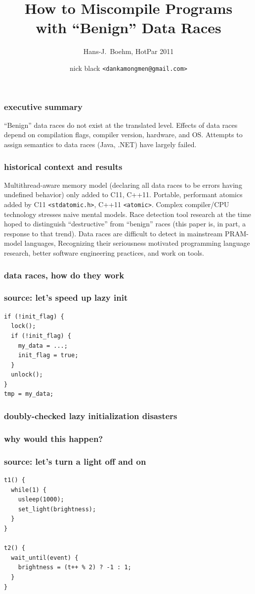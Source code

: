 \documentclass{beamer}
\title{How to Miscompile Programs\\ with ``Benign'' Data Races}
\subtitle{Hans-J.\ Boehm, HotPar 2011}
\author{nick black {\texttt{<dankamongmen@gmail.com>}}}
\institute{Atlanta PWL \#09, 2018-10-09}
\date{}
\begin{document}
\begin{frame}
\titlepage
\end{frame}

\begin{frame}
\frametitle{executive summary}
``Benign'' data races do not exist at the translated level.
\vfill
Effects of data races depend on compilation flags, compiler version, hardware,
and OS.
\vfill
Attempts to assign semantics to data races (Java, .NET) have largely failed.
\end{frame}

\begin{frame}
\frametitle{historical context and results}
Multithread-aware memory model (declaring all data races to be errors having undefined behavior) only added to C11, C++11.
\vfill
Portable, performant atomics added by C11 \texttt{<stdatomic.h>}, C++11 \texttt{<atomic>}.
\vfill
Complex compiler/CPU technology stresses naive mental models.
\vfill
Race detection tool research at the time hoped to distinguish ``destructive'' from ``benign'' races (this paper is, in part, a response to that trend).
\vfill
Data races are difficult to detect in mainstream PRAM-model languages, Recognizing their seriousness motivated programming language research, better software engineering practices, and work on tools.
\end{frame}

\begin{frame}
\frametitle{data races, how do they work}
\end{frame}

\begin{frame}[fragile]
\frametitle{source: let's speed up lazy init}
\begin{lstlisting}
if (!init_flag) {
  lock();
  if (!init_flag) {
    my_data = ...;
    init_flag = true;
  }
  unlock();
}
tmp = my_data;
\end{lstlisting}
\end{frame}

\begin{frame}
\frametitle{doubly-checked lazy initialization disasters}
\end{frame}

\begin{frame}
\frametitle{why would this happen?}
\end{frame}

\begin{frame}[fragile]
\frametitle{source: let's turn a light off and on}
\begin{lstlisting}
t1() {
  while(1) {
    usleep(1000);
    set_light(brightness);
  }
}

t2() {
  wait_until(event) {
    brightness = (t++ % 2) ? -1 : 1;
  }
}
\end{lstlisting}
\end{frame}
\end{document}
